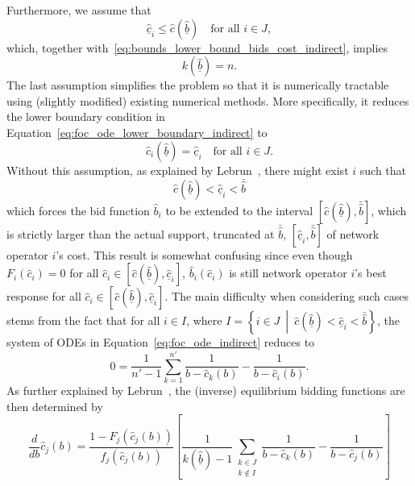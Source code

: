 Furthermore, we assume that
\begin{equation*}
  \underline{\hat{c}}_i \leq \hat{c}(\underline{\hat{b}}) \quad\text{for all } i\in J,
\end{equation*}
which, together with~\eqref{eq:bounds_lower_bound_bids_cost_indirect}, implies
\begin{equation*}
  k(\underline{\hat{b}}) = n.
\end{equation*}
The last assumption simplifies the problem so that it is numerically tractable using (slightly modified) existing numerical methods. More specifically, it reduces the lower boundary condition in Equation~\eqref{eq:foc_ode_lower_boundary_indirect} to
\begin{equation}
  \label{eq:foc_ode_lower_boundary_reduced_indirect}
  \hat{c}_i(\underline{\hat{b}}) = \underline{\hat{c}}_i \quad\text{for all } i\in J.
\end{equation}
Without this assumption, as explained by Lebrun~\cite{Lebrun2006}, there might exist $i$ such that
\begin{equation*}
  \hat{c}(\underline{\hat{b}}) < \underline{\hat{c}}_i < \bar{\hat{b}}
\end{equation*}
which forces the bid function $\hat{b}_i$ to be extended to the interval $[\hat{c}(\underline{\hat{b}}), \bar{\hat{b}}]$, which is strictly larger than the actual support, truncated at $\bar{\hat{b}}$, $[\underline{\hat{c}}_i, \bar{\hat{b}}]$ of network operator $i$'s cost. This result is somewhat confusing since even though $F_i(\hat{c}_i) = 0$ for all $\hat{c}_i\in [\hat{c}(\underline{\hat{b}}), \underline{\hat{c}}_i]$, $\hat{b}_i(\hat{c}_i)$ is still network operator $i$'s best response for all $\hat{c}_i\in [\hat{c}(\underline{\hat{b}}), \underline{\hat{c}}_i]$. The main difficulty when considering such cases stems from the fact that for all $i\in I$, where $I = \left\{i\in J \:\middle\vert\: \hat{c}(\underline{\hat{b}}) < \underline{\hat{c}}_i < \bar{\hat{b}} \right\}$, the system of ODEs in Equation~\eqref{eq:foc_ode_indirect} reduces to
\begin{equation}
  \label{eq:foc_reduced_indirect}
  0 = \frac{1}{n'-1}\sum_{k=1}^{n'}\frac{1}{b - \hat{c}_k(b)} - \frac{1}{b - \hat{c}_i(b)}.
\end{equation}
As further explained by Lebrun~\cite{Lebrun2006}, the (inverse) equilibrium bidding functions are then determined by
\begin{equation}
  \label{eq:foc_ode_reduced_indirect}
  \frac{d}{db}\hat{c}_j(b) = \frac{1 - F_j(\hat{c}_j(b))}{f_j(\hat{c}_j(b))} \left[ \frac{1}{k(\underline{\hat{b}}) - 1}\sum_{\substack{k\in J\\ k\not\in I}}\frac{1}{b - \hat{c}_k(b)} - \frac{1}{b - \hat{c}_j(b)}\right]
\end{equation}
